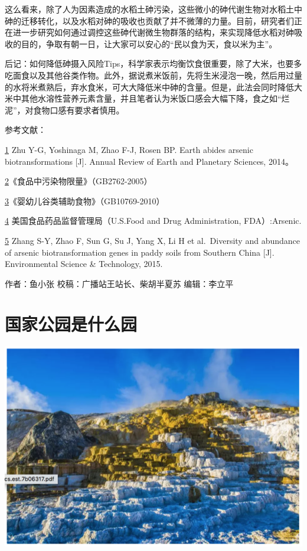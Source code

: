 \documentclass[
]{book}
\begin{document}
这么看来，除了人为因素造成的水稻土砷污染，这些微小的砷代谢生物对水稻土中砷的迁移转化，以及水稻对砷的吸收也贡献了并不微薄的力量。目前，研究者们正在进一步研究如何通过调控这些砷代谢微生物群落的结构，来实现降低水稻对砷吸收的目的，争取有朝一日，让大家可以安心的``民以食为天，食以米为主''。

后记：如何降低砷摄入风险Tips，科学家表示均衡饮食很重要，除了大米，也要多吃面食以及其他谷类作物。此外，据说煮米饭前，先将生米浸泡一晚，然后用过量的水将米煮熟后，弃水食米，可大大降低米中砷的含量。但是，此法会同时降低大米中其他水溶性营养元素含量，并且笔者认为米饭口感会大幅下降，食之如``烂泥''，对食物口感有要求者慎用。

参考文献：

\href{陈心想，耿增超。西北农林科技大学学报（自然科学版），2013，41:\%20167-174．}{1} Zhu Y-G, Yoshinaga M, Zhao F-J, Rosen BP. Earth abides arsenic biotransformations {[}J{]}. Annual Review of Earth and Planetary Sciences, 2014。

\href{Kezhen\%20Qian,\%20Ajay\%20Kumar,\%20et.al.\%20Renew.\%20and\%20Sustain.\%20Energy\%20Reviews,\%202015,\%2042:\%201055-1064.}{2}《食品中污染物限量》（GB2762-2005）

\href{Puga\%20A\%20P,\%20Abreu\%20C\%20A,\%20et\%20al.\%20J.\%20of\%20Environ.\%20Manage.,\%202015,\%20159:\%2086–93.}{3}《婴幼儿谷类辅助食物》（GB10769-2010）

\href{Khan\%20S,\%20Cai\%20Chao,\%20et\%20al．\%20Environ.\%20Sci.\%20\&\%20Technol.,\%202013,\%2047\%20:\%208624-8632．}{4} 美国食品药品监督管理局（U.S.Food and Drug Administration, FDA）:Arsenic.

\href{Bi\%20H,\%20Huang\%20X,\%20et\%20al.\%20Small\%202014,\%2010,\%203544.}{5} Zhang S-Y, Zhao F, Sun G, Su J, Yang X, Li H et al.~Diversity and abundance of arsenic biotransformation genes in paddy soils from Southern China {[}J{]}. Environmental Science \& Technology, 2015.

作者：鱼小张
校稿：广播站王站长、柴胡半夏苏
编辑：李立平

\hypertarget{ux56fdux5bb6ux516cux56edux662fux4ec0ux4e48ux56ed}{%
\section{国家公园是什么园}\label{ux56fdux5bb6ux516cux56edux662fux4ec0ux4e48ux56ed}}

\includegraphics[width=8.33in]{images/park1}
\end{document}
